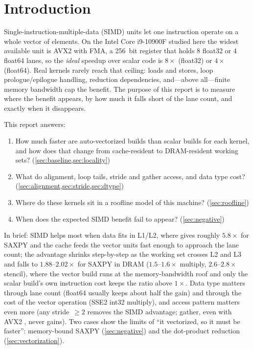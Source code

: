 \section{Introduction}\label{sec:intro}

Single-instruction-multiple-data (SIMD) units let one instruction operate on a whole vector of
elements. On the Intel Core i9-10900F studied here the widest available unit is AVX2 with FMA, a
\qty{256}{bit} register that holds \num{8} float32 or \num{4} float64 lanes, so the \emph{ideal}
speedup over scalar code is $8\times$ (float32) or $4\times$ (float64). Real kernels rarely reach
that ceiling: loads and stores, loop prologue/epilogue handling, reduction dependencies, and---above
all---finite memory bandwidth cap the benefit. The purpose of this report is to measure where the
benefit appears, by how much it falls short of the lane count, and exactly when it disappears.

This report answers:
\begin{enumerate}
  \item How much faster are auto-vectorized builds than scalar builds for each kernel, and how does
        that change from cache-resident to DRAM-resident working sets? (\cref{sec:baseline,sec:locality})
  \item What do alignment, loop tails, stride and gather access, and data type cost? (\cref{sec:alignment,sec:stride,sec:dtype})
  \item Where do these kernels sit in a roofline model of this machine? (\cref{sec:roofline})
  \item When does the expected SIMD benefit fail to appear? (\cref{sec:negative})
\end{enumerate}

In brief: SIMD helps most when data fits in L1/L2, where  gives roughly $5.8\times$ for
SAXPY and the cache feeds the vector units fast enough to approach the lane count; the advantage
shrinks step-by-step as the working set crosses L2 and L3 and falls to $1.88\text{--}2.02\times$ for SAXPY
in DRAM ($1.5\text{--}1.6\times$ multiply, $2.6\text{--}2.8\times$ stencil), where the vector build runs at the memory-bandwidth roof and only the scalar build's own
instruction cost keeps the ratio above $1\times$. Data type matters through lane count (float64
usually keeps about half the gain) and through the cost of the vector operation (SSE2 int32
multiply), and access pattern matters even more (any stride~$\ge2$ removes the SIMD
advantage; gather, even with AVX2 , never gains). Two cases show the limits of ``it vectorized, so it
must be faster'': memory-bound SAXPY (\cref{sec:negative}) and the dot-product reduction
(\cref{sec:vectorization}).
